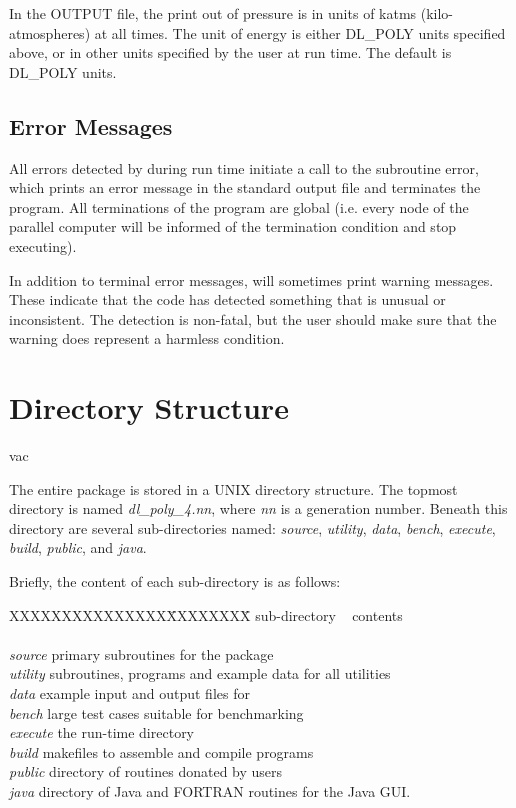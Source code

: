  In the \D OUTPUT file, the print out of
pressure is in units of katms
(kilo-atmospheres) at all times.  The unit of energy is either
DL\_POLY units specified above, or in other units specified by the
user at run time.  The default is DL\_POLY units.

\subsection{Error Messages}

All errors detected by \D during run time initiate a call to the
subroutine {\sc error}, which prints an error message in the
standard output file and terminates the program.  All terminations
of the program are global (i.e. every node of the parallel
computer will be informed of the termination condition and stop
executing).

In addition to terminal error messages, \D will sometimes print
warning messages.  These indicate that the code has detected
something that is unusual or inconsistent.  The detection is
non-fatal, but the user should make sure that the warning does
represent a harmless condition.

\section{Directory Structure}
\label{directory-structure}vac

The entire \D package is stored in a UNIX directory structure. The
topmost directory is named {\em dl\_poly\_4.nn}, where {\em nn} is
a generation number.  Beneath this directory are several
sub-directories named: {\em source},
{\em utility},
{\em data},
{\em bench},
{\em execute},
{\em build},
{\em public}, and
{\em java}.

Briefly, the content of each sub-directory is as follows:
\begin{tabbing}
XXXXXXXXXXXXXXX\= XXXXXXXX\= \kill
sub-directory\> ~ \> contents \\
\> ~ \> \\
{\em source} \> primary subroutines for the \D package \\
{\em utility} \> subroutines, programs and example data for all utilities \\
{\em data} \> example input and output files for \D \\
{\em bench} \> large test cases suitable for benchmarking \\
{\em execute} \> the \D run-time directory \\
{\em build} \> makefiles to assemble and compile \D programs \\
{\em public} \> directory of routines donated by \D users \\
{\em java} \> directory of Java and FORTRAN routines for the Java GUI. \\
\end{tabbing}

